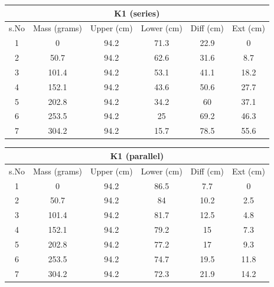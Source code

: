 \begin{center}
\begin{tabular}{|c|c|c|c|c|c|}
\hline
\multicolumn{6}{|c|}{\textbf{K1 (series)}}                                          \\ \hline
s.No & Mass   (grams) & Upper   (cm) & Lower   (cm) & Diff     (cm) & Ext      (cm) \\ \hline
1    & 0              & 94.2         & 71.3         & 22.9          & 0             \\ \hline
2    & 50.7           & 94.2         & 62.6         & 31.6          & 8.7           \\ \hline
3    & 101.4          & 94.2         & 53.1         & 41.1          & 18.2          \\ \hline
4    & 152.1          & 94.2         & 43.6         & 50.6          & 27.7          \\ \hline
5    & 202.8          & 94.2         & 34.2         & 60            & 37.1          \\ \hline
6    & 253.5          & 94.2         & 25           & 69.2          & 46.3          \\ \hline
7    & 304.2          & 94.2         & 15.7         & 78.5          & 55.6          \\ \hline
\end{tabular}
\end{center}

\begin{center}
\begin{tabular}{|c|c|c|c|c|c|}
\hline
\multicolumn{6}{|c|}{\textbf{K1 (parallel)}}                                        \\ \hline
s.No & Mass   (grams) & Upper   (cm) & Lower   (cm) & Diff     (cm) & Ext      (cm) \\ \hline
1    & 0              & 94.2         & 86.5         & 7.7           & 0             \\ \hline
2    & 50.7           & 94.2         & 84           & 10.2          & 2.5           \\ \hline
3    & 101.4          & 94.2         & 81.7         & 12.5          & 4.8           \\ \hline
4    & 152.1          & 94.2         & 79.2         & 15            & 7.3           \\ \hline
5    & 202.8          & 94.2         & 77.2         & 17            & 9.3           \\ \hline
6    & 253.5          & 94.2         & 74.7         & 19.5          & 11.8          \\ \hline
7    & 304.2          & 94.2         & 72.3         & 21.9          & 14.2          \\ \hline
\end{tabular}
\end{center}

